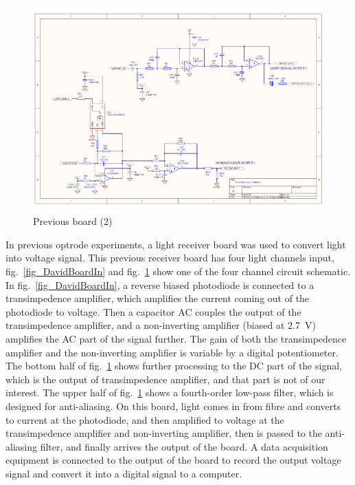 \begin{figure}[h]
\centering
\includegraphics[width=0.9\linewidth]{4-ANC_Sys/FibreReceiver_3c_Output1.pdf}
\caption{Previous board (2)}
\label{fig_DavidBoardOut}
\end{figure}

In previous optrode experiments, a light receiver board was used to convert light into voltage signal.  This previous receiver board has four light channels input, fig.~\ref{fig_DavidBoardIn} and fig.~\ref{fig_DavidBoardOut} show one of the four channel circuit schematic.  In fig.~\ref{fig_DavidBoardIn}, a reverse biased photodiode is connected to a transimpedence amplifier, which amplifies the current coming out of the photodiode to voltage.  Then a capacitor AC couples the output of the transimpedence amplifier, and a non-inverting amplifier (biased at \qty{2.7}{V}) amplifies the AC part of the signal further.  The gain of both the transimpedence amplifier and the non-inverting amplifier is variable by a digital potentiometer.  The bottom half of fig.~\ref{fig_DavidBoardOut} shows further processing to the DC part of the signal, which is the output of transimpedence amplifier, and that part is not of our interest.  The upper half of fig.~\ref{fig_DavidBoardOut} shows a fourth-order low-pass filter, which is designed for anti-aliasing.  On this board, light comes in from fibre and converts to current at the photodiode, and then amplified to voltage at the transimpedence amplifier and non-inverting amplifier, then is passed to the anti-aliasing filter, and finally arrives the output of the board.  A data acquisition equipment is connected to the output of the board to record the output voltage signal and convert it into a digital signal to a computer.

